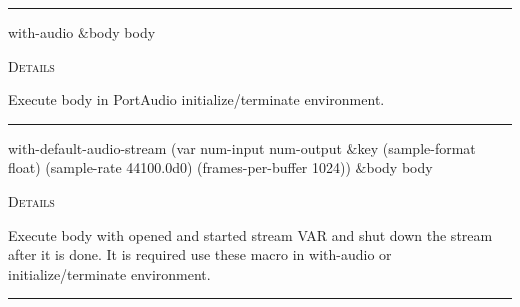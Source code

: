 \documentclass[a4paper]{report}
\begin{document}
    \rule{\linewidth}{0.1mm}
    
    \label{portaudio__fun__with-audio}
    \begin{defun}[Macro]
    with-audio $\&$body body


	
    \bigskip
    \textsc{Details}

Execute body in PortAudio initialize/terminate environment.


    
    \end{defun}
  
  

    \rule{\linewidth}{0.1mm}
    
    \label{portaudio__fun__with-default-audio-stream}
    \begin{defun}[Macro]
    with-default-audio-stream (var num-input num-output $\&$key (sample-format float) (sample-rate 44100.0d0)
 (frames-per-buffer 1024)) $\&$body body


	
    \bigskip
    \textsc{Details}

Execute body with opened and started stream VAR and shut down   the stream after it is done. It is required use these macro in with-audio or initialize/terminate environment.


    
    \end{defun}
  
  

    \rule{\linewidth}{0.1mm}
    
\end{document}
